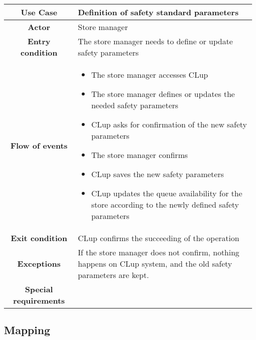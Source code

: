 \documentclass[../../main.tex]{subfiles}
\begin{document}
      \begin{table}[H]
        \centering
          \begin{tabular}{c m{}}
          \hline
          \textbf{Use Case} & Definition of safety standard parameters\\ \hline
          \textbf{Actor} & Store manager\\ \hline
          \textbf{Entry condition} & The store manager needs to define or update safety parameters \\  \hline
          \textbf{Flow of events} & \begin{itemize}
                                      \item The store manager accesses CLup
                                      \item The store manager defines or updates the needed safety parameters
                                      \item CLup asks for confirmation of the new safety parameters
                                      \item The store manager confirms
                                      \item CLup saves the new safety parameters
                                      \item CLup updates the queue availability for the store according to the newly defined safety parameters
                                    \end{itemize}\\ \hline
          \textbf{Exit condition} & CLup confirms the succeeding of the operation \\ \hline
          \textbf{Exceptions} & If the store manager does not confirm, nothing happens on CLup system, and the old safety parameters are kept.\\ \hline
          \textbf{Special requirements} &\\ \hline
          \end{tabular}
      \end{table}


    \subsection{Mapping}
\end{document}
